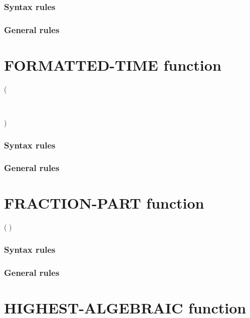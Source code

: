 \subsubsection{Syntax rules}

\subsubsection{General rules}

\section{FORMATTED-TIME function}

\begin{syntax}
    ( \argument \argument
  \begin{0-1}
    \argument \\
  \end{0-1}
  )
\end{syntax}

\subsubsection{Syntax rules}

\subsubsection{General rules}

\section{FRACTION-PART function}

\begin{syntax}
    ( \argument )
\end{syntax}

\subsubsection{Syntax rules}

\subsubsection{General rules}

\section{HIGHEST-ALGEBRAIC function}

